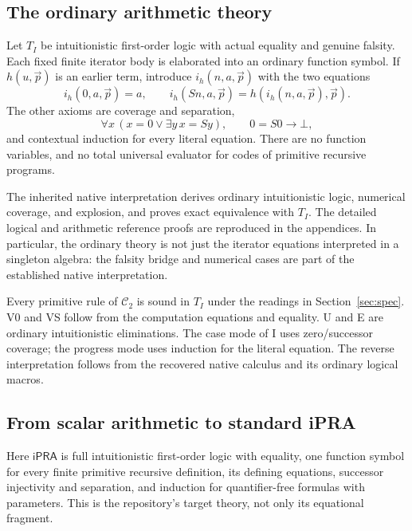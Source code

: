 \documentclass[11pt,letterpaper]{article}
\theoremstyle{definition}
\newcommand{\ipra}{\mathsf{iPRA}}
\newcommand{\Cred}{\mathcal C_2}
\begin{document}
\subsection{The ordinary arithmetic theory}

Let $T_I$ be intuitionistic first-order logic with actual equality
and genuine falsity. Each fixed finite iterator body is elaborated
into an ordinary function symbol. If $h(u,\vec p)$ is an earlier
term, introduce $i_h(n,a,\vec p)$ with the two equations
\[
 i_h(0,a,\vec p)=a,\qquad
 i_h(Sn,a,\vec p)=h(i_h(n,a,\vec p),\vec p).
\]
The other axioms are coverage and separation,
\[
 \forall x\,(x=0\lor\exists y\,x=Sy),\qquad
 0=S0\longrightarrow\bot,
\]
and contextual induction for every literal equation. There are
no function variables, and no total universal evaluator for
codes of primitive recursive programs.

The inherited native interpretation derives ordinary intuitionistic
logic, numerical coverage, and explosion, and proves exact
equivalence with $T_I$. The detailed logical and arithmetic
reference proofs are reproduced in the appendices. In particular,
the ordinary theory is not just the iterator equations interpreted
in a singleton algebra: the falsity bridge and numerical cases
are part of the established native interpretation.

Every primitive rule of $\Cred$ is sound in $T_I$ under the readings
in Section~\ref{sec:spec}. V0 and VS follow from the computation
equations and equality. U and E are ordinary intuitionistic
eliminations. The case mode of I uses zero/successor coverage;
the progress mode uses induction for the literal equation.
The reverse interpretation follows from the recovered native
calculus and its ordinary logical macros.

\subsection{From scalar arithmetic to standard iPRA}

Here $\ipra$ is full intuitionistic first-order logic with equality,
one function symbol for every finite primitive recursive definition,
its defining equations, successor injectivity and separation,
and induction for quantifier-free formulas with parameters.
This is the repository's target theory, not only its equational
fragment.
\end{document}
